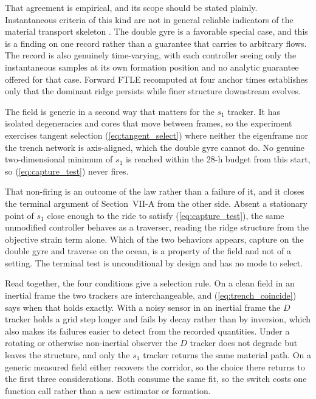 \documentclass[lettersize,journal]{IEEEtran}
\begin{document}
That agreement is empirical, and its scope should be stated plainly.
Instantaneous criteria of this kind are not in general reliable
indicators of the material transport skeleton \cite{24}. The double
gyre is a favorable special case, and this is a finding on one record
rather than a guarantee that carries to arbitrary flows. The record is
also genuinely time-varying, with each controller seeing only the
instantaneous samples at its own formation position and no analytic
guarantee offered for that case. Forward FTLE recomputed at four anchor
times establishes only that the dominant ridge persists while finer
structure downstream evolves.

The field is generic in a second way that matters for the $s_1$
tracker. It has isolated degeneracies and cores that move between
frames, so the experiment exercises tangent selection
(\ref{eq:tangent_select}) where neither the eigenframe nor the trench
network is axis-aligned, which the double gyre cannot do. No genuine
two-dimensional minimum of $s_1$ is reached within the 28-h budget from
this start, so (\ref{eq:capture_test}) never fires.

That non-firing is an outcome of the law rather than a failure of it,
and it closes the terminal argument of Section~\mbox{VII-A} from the
other side. Absent a stationary point of $s_1$ close enough to the ride
to satisfy (\ref{eq:capture_test}), the same unmodified controller
behaves as a traverser, reading the ridge structure from the objective
strain term alone. Which of the two behaviors appears, capture on the
double gyre and traverse on the ocean, is a property of the field and
not of a setting. The terminal test is unconditional by design and has
no mode to select.

Read together, the four conditions give a selection rule. On a clean
field in an inertial frame the two trackers are interchangeable, and
(\ref{eq:trench_coincide}) says when that holds exactly. With a noisy
sensor in an inertial frame the $D$ tracker holds a grid step longer
and fails by decay rather than by inversion, which also makes its
failures easier to detect from the recorded quantities. Under a
rotating or otherwise non-inertial observer the $D$ tracker does not
degrade but leaves the structure, and only the $s_1$ tracker returns
the same material path. On a generic measured field either recovers the
corridor, so the choice there returns to the first three
considerations. Both consume the same fit, so the switch costs one
function call rather than a new estimator or formation.
\end{document}
